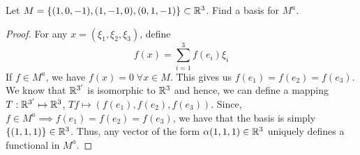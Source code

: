 \begin{question}
    Let $M = \{(1,0,-1) , (1,-1,0), (0,1,-1)\} \subset \mathbb{R}^3$. Find a basis for $M^a$.
    \label{section2.10-15}
\end{question}
\begin{proof}
        For any $x = (\xi_1 , \xi_2 , \xi_3)$, define 
        \[f(x) = \sum_{i=1}^3 f(e_i) \xi_i\]
        If $f \in M^a$, we have $f(x) = 0 \;\forall x \in M$. This gives us $f(e_1) = f(e_2) = f(e_3)$. We know that $\mathbb{R}^{3^\prime}$ is isomorphic to $\mathbb{R}^3$ and hence, we can define a mapping $T : \mathbb{R}^{3^\prime} \mapsto \mathbb{R}^3$, $Tf \mapsto (f(e_1) , f(e_2) , f(e_3))$. Since, $f \in M^a \implies f(e_1) = f(e_2) = f(e_3)$, we have that the basis is simply $\{(1,1,1)\} \in \mathbb{R}^3$. Thus, any vector of the form $\alpha(1,1,1) \in \mathbb{R}^3$ uniquely defines a functional in $M^a$.
\end{proof}